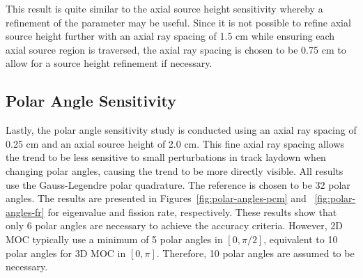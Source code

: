 This result is quite similar to the axial source height sensitivity whereby a refinement of the parameter may be useful. Since it is not possible to refine axial source height further with an axial ray spacing of 1.5 cm while ensuring each axial source region is traversed, the axial ray spacing is chosen to be 0.75 cm to allow for a source height refinement if necessary.

\subsection{Polar Angle Sensitivity}
\label{sec:polar-angle-sensitivity}

Lastly, the polar angle sensitivity study is conducted using an axial ray spacing of 0.25 cm and an axial source height of 2.0 cm. This fine axial ray spacing allows the trend to be less sensitive to small perturbations in track laydown when changing polar angles, causing the trend to be more directly visible. All results use the Gauss-Legendre polar quadrature. The reference is chosen to be 32 polar angles. The results are presented in Figures~\ref{fig:polar-angles-pcm} and ~\ref{fig:polar-angles-fr} for eigenvalue and fission rate, respectively. These results show that only 6 polar angles are necessary to achieve the accuracy criteria. However, 2D \ac{MOC} typically use a minimum of 5 polar angles in $[0,\pi/2]$, equivalent to 10 polar angles for 3D \ac{MOC} in $[0,\pi]$. Therefore, 10 polar angles are assumed to be necessary.

